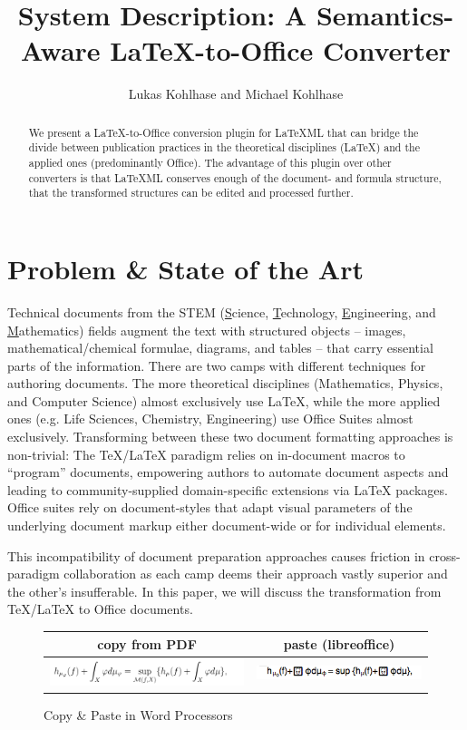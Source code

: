 \documentclass{llncs}
\title{System Description: A Semantics-Aware {\LaTeX}-to-Office Converter}
\author{Lukas Kohlhase and Michael Kohlhase}
\institute{Mathematics/Computer Science\\
  Jacobs University Bremen}
\def\latexml{{\LaTeX}ML\xspace}
\begin{document}
 
\maketitle
\begin{abstract}
  We present a {\LaTeX}-to-Office conversion plugin for \latexml that can bridge the
  divide between publication practices in the theoretical disciplines (\LaTeX) and the
  applied ones (predominantly Office). The advantage of this plugin over other converters
  is that \latexml conserves enough of the document- and formula structure, that the
  transformed structures can be edited and processed further.
\end{abstract}

\section{Problem \& State of the Art}\label{sec:intro}

Technical documents from the STEM (\underline{S}cience, \underline{T}echnology,
\underline{E}ngineering, and \underline{M}athematics) fields augment the text with structured
objects -- images, mathematical/chemical formulae, diagrams, and tables -- that carry
essential parts of the information. There are two camps with different techniques for
authoring documents. The more theoretical disciplines (Mathematics, Physics, and Computer
Science) almost exclusively use {\LaTeX}, while the more applied ones (e.g. Life Sciences,
Chemistry, Engineering) use Office Suites almost exclusively. Transforming between these
two document formatting approaches is non-trivial: The {\TeX/\LaTeX} paradigm relies on
in-document macros to ``program'' documents, empowering authors to automate document
aspects and leading to community-supplied domain-specific extensions via {\LaTeX}
packages. Office suites rely on document-styles that adapt visual parameters of the
underlying document markup either document-wide or for individual elements.

This incompatibility of document preparation approaches causes friction in cross-paradigm
collaboration as each camp deems their approach vastly superior and the other's
insufferable. In this paper, we will discuss the transformation from {\TeX/\LaTeX} to
Office documents.

\begin{figure}[ht]\centering
  \begin{tabular}{|c|c|}\hline%
    copy from PDF & paste (libreoffice)\\\hline
    \includegraphics[width=6cm]{mathsnippet} & 
    \includegraphics[width=5cm]{mathsnippet-libreoffice}\\\hline
  \end{tabular}
\caption{Copy \& Paste in Word Processors}\label{fig:cnp}
\end{figure}
\end{document}
